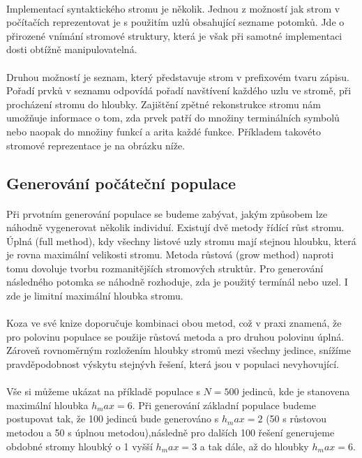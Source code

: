 \documentclass[bc,male,java,dept460]{diploma}		%
\begin{document}
\paragraph*{}
Implementací syntaktického stromu je několik. Jednou z možností jak strom v počítačích reprezentovat je s použitím uzlů obsahující sezname potomků. Jde o přirozené vnímání stromové struktury, která je však při samotné implementaci dosti obtížně manipulovatelná. 

\paragraph*{}
Druhou možností je seznam, který představuje strom v prefixovém tvaru zápisu. Pořadí prvků v seznamu odpovídá pořadí navštívení každého uzlu ve stromě, při procházení stromu do hloubky. Zajištění zpětné rekonstrukce stromu nám umožňuje informace o tom, zda prvek patří do množiny terminálních symbolů nebo naopak do množiny funkcí a arita každé funkce. Příkladem takovéto stromové reprezentace je na obrázku níže.

\subsection{Generování počáteční populace}
\paragraph*{}
Při prvotním generování populace se budeme zabývat, jakým způsobem lze náhodně vygenerovat několik individuí. Existují dvě metody řídící růst stromu. Úplná (full method), kdy všechny listové uzly stromu mají stejnou hloubku, která je rovna maximální velikosti stromu. Metoda růstová (grow method) naproti tomu dovoluje tvorbu rozmanitějších stromových struktůr. Pro generování následného potomka se náhodně rozhoduje, zda je použitý termínál nebo uzel. I zde je limitní maximální hloubka stromu.

\paragraph*{}
Koza ve své knize \cite{kozagp} doporučuje kombinaci obou metod, což v praxi znamená, že pro polovinu populace se použije růstová metoda a pro druhou polovinu úplná. Zároveň rovnoměrným rozložením hloubky stromů mezi všechny jedince, snížíme pravděpodobnost výskytu stejnývh řešení, která jsou v populaci nevyhovující. 

\paragraph*{}
Vše si můžeme ukázat na příkladě populace s $N=500$ jedinců, kde je stanovena maximální hloubka $h_max=6$. Při generování základní populace budeme postupovat tak, že 100 jedinců bude generováno s $h_max=2$ (50 s růstovou metodou a 50 s úplnou metodou),následně pro dalších 100 řešení generujeme obdobné stromy hloubký o 1 vyšší $h_max=3$ a tak dále, až do hloubky $h_max=6$.
\end{document}
